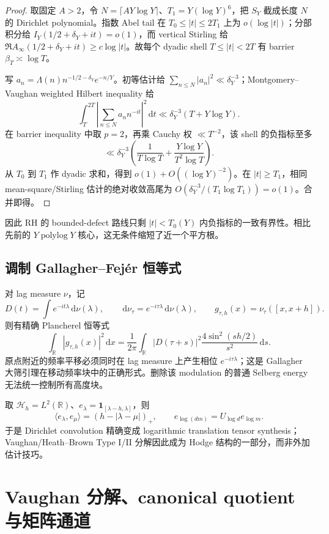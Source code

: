 \documentclass[UTF8,11pt,a4paper]{ctexart}
\theoremstyle{definition}
\theoremstyle{remark}
\newcommand{\R}{\mathbb R}
\newcommand{\dd}{\,\mathrm d}
\newcommand{\1}{\mathbf 1}
\newcommand{\cH}{\mathcal H}
\begin{document}
\begin{proof}
取固定 $A>2$，令 $N=\lceil AY\log Y\rceil$、$T_1=Y(\log Y)^6$，把 $S_Y$ 截成长度 $N$ 的 Dirichlet polynomial。指数 Abel tail 在 $T_0\leq|t|\leq2T_1$ 上为 $o(\log|t|)$；分部积分给 $I_Y(1/2+\delta_Y+it)=o(1)$，而 vertical Stirling 给
$\Re A_\infty(1/2+\delta_Y+it)\geq c\log|t|$。故每个 dyadic shell $T\leq|t|<2T$ 有 barrier $\beta_T\asymp\log T$。

写 $a_n=\Lambda(n)n^{-1/2-\delta_Y}e^{-n/Y}$。初等估计给
$\sum_{n\leq N}|a_n|^2\ll\delta_Y^{-3}$；Montgomery--Vaughan weighted Hilbert inequality\cite{MontgomeryVaughan} 给
\[
 \int_T^{2T}\left|\sum_{n\leq N}a_nn^{-it}\right|^2\dd t
 \ll\delta_Y^{-3}(T+Y\log Y).
\]
在 barrier inequality 中取 $p=2$，再乘 Cauchy 权 $\ll T^{-2}$，该 shell 的负指标至多
\[
 \ll\delta_Y^{-3}\left(\frac1{T\log T}
 +\frac{Y\log Y}{T^2\log T}\right).
\]
从 $T_0$ 到 $T_1$ 作 dyadic 求和，得到 $o(1)+O((\log Y)^{-2})$。在 $|t|\geq T_1$，相同 mean-square/Stirling 估计的绝对收敛高尾为
$O(\delta_Y^{-3}/(T_1\log T_1))=o(1)$。合并即得。
\end{proof}

因此 RH 的 bounded-defect 路线只剩 $|t|<T_0(Y)$ 内负指标的一致有界性。相比先前的 $Y\operatorname{polylog}Y$ 核心，这无条件缩短了近一个平方根。

\subsection{调制 Gallagher--Fej\'er 恒等式}

对 lag measure $\nu$，记
\[
  D(t)=\int e^{-it\lambda}\dd\nu(\lambda),\qquad
  \dd\nu_\tau=e^{-i\tau\lambda}\dd\nu(\lambda),\qquad
  g_{\tau,h}(x)=\nu_\tau([x,x+h]).
\]
则有精确 Plancherel 恒等式
\[
 \int_\R|g_{\tau,h}(x)|^2\dd x
 =\frac1{2\pi}\int_\R|D(\tau+s)|^2
 \frac{4\sin^2(sh/2)}{s^2}\dd s.
\]
原点附近的频率平移必须同时在 lag measure 上产生相位 $e^{-i\tau\lambda}$；这是 Gallagher 大筛引理\cite{Gallagher}在移动频率块中的正确形式。删除该 modulation 的普通 Selberg energy 无法统一控制所有高度块。

取 $\cH_h=L^2(\R)$、$e_\lambda=\1_{[\lambda-h,\lambda]}$，则
\[
 \langle e_\lambda,e_\mu\rangle=(h-|\lambda-\mu|)_+,
 \qquad e_{\log(dm)}=U_{\log d}e_{\log m}.
\]
于是 Dirichlet convolution 精确变成 logarithmic translation tensor synthesis；Vaughan/Heath--Brown Type I/II 分解因此成为 Hodge 结构的一部分，而非外加估计技巧。

\section{Vaughan 分解、canonical quotient 与矩阵通道}
\end{document}
